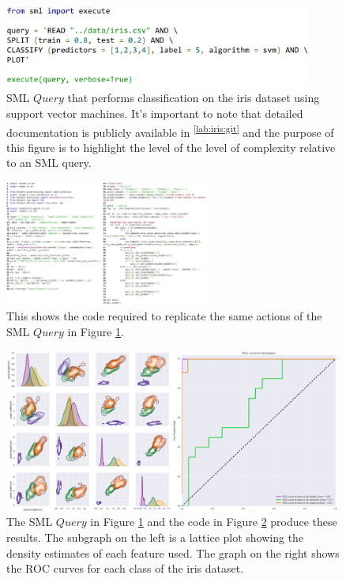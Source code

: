 \documentclass[jair,twoside,11pt,theapa]{article}
\begin{document}
\begin{figure}
\includegraphics[width=0.9\textwidth]{figs/iris_sml.png}
\centering
\caption{SML \(Query\) that performs classification on the iris dataset using support vector machines. It's important to note that detailed documentation is publicly available in \textsuperscript{\ref{lab:iris:git}} and the purpose of this figure is to highlight the level of the level of complexity relative to an SML query.}
\label{fig:SML:IrisQuery}
\end{figure}

\begin{figure}
\includegraphics[width=0.6\textwidth]{figs/iris_manual.png}
\centering
\caption{This shows the code required to replicate the same actions of the SML \(Query\) in Figure \ref{fig:SML:IrisQuery}. }
\label{fig:Manual:IrisCode}
\end{figure}

\begin{figure}
\includegraphics[width=0.99\textwidth]{figs/iris_results.png}
\centering
\caption{The SML \(Query\) in Figure \ref{fig:SML:IrisQuery} and the code in Figure \ref{fig:Manual:IrisCode} produce these results. The subgraph on the left is a lattice plot showing the density estimates of each feature used. The graph on the right shows the ROC curves for each class of the iris dataset.}
\label{fig:IrisResults}
\end{figure}
\end{document}
